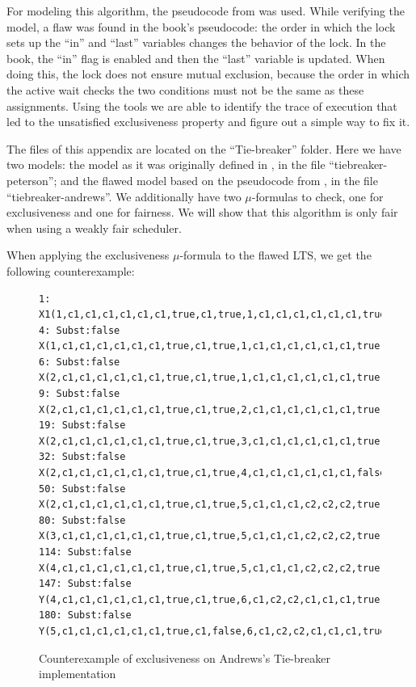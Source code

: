 \documentclass[11pt]{article}
\theoremstyle{definition}
\theoremstyle{plain}
\theoremstyle{definition}
\begin{document}
\begin{appendices}
For modeling this algorithm, the pseudocode from \cite{andrews2000foundations} was used. While verifying the model, a flaw was found in the book's pseudocode: the order in which the lock sets up the ``in'' and ``last'' variables changes the behavior of the lock. In the book, the ``in'' flag is enabled and then the ``last'' variable is updated. When doing this, the lock does not ensure mutual exclusion, because the order in which the active wait checks the two conditions must not be the same as these assignments. Using the tools we are able to identify the trace of execution that led to the unsatisfied exclusiveness property and figure out a simple way to fix it.

The files of this appendix are located on the ``Tie-breaker'' folder. Here we have two models: the model as it was originally defined in \cite{Peterson1981115}, in the file ``tiebreaker-peterson''; and the flawed model based on the pseudocode from \cite{andrews2000foundations}, in the file ``tiebreaker-andrews''. We additionally have two $ \mu $-formulas to check, one for exclusiveness and one for fairness. We will show that this algorithm is only fair when using a weakly fair scheduler.

When applying the exclusiveness $ \mu$-formula to the flawed LTS, we get the following counterexample:

\begin{figure}[h]
\begin{lstlisting}
1: X1(1,c1,c1,c1,c1,c1,c1,true,c1,true,1,c1,c1,c1,c1,c1,c1,true,c1,true,false,false,c1)
4: Subst:false   X(1,c1,c1,c1,c1,c1,c1,true,c1,true,1,c1,c1,c1,c1,c1,c1,true,c1,true,false,false,c1)
6: Subst:false   X(2,c1,c1,c1,c1,c1,c1,true,c1,true,1,c1,c1,c1,c1,c1,c1,true,c1,true,false,false,c1)
9: Subst:false   X(2,c1,c1,c1,c1,c1,c1,true,c1,true,2,c1,c1,c1,c1,c1,c1,true,c2,true,false,false,c2)
19: Subst:false   X(2,c1,c1,c1,c1,c1,c1,true,c1,true,3,c1,c1,c1,c1,c1,c1,true,c1,true,false,true,c2)
32: Subst:false   X(2,c1,c1,c1,c1,c1,c1,true,c1,true,4,c1,c1,c1,c1,c1,c1,false,c1,true,false,true,c2)
50: Subst:false   X(2,c1,c1,c1,c1,c1,c1,true,c1,true,5,c1,c1,c1,c2,c2,c2,true,c1,false,false,true,c2)
80: Subst:false   X(3,c1,c1,c1,c1,c1,c1,true,c1,true,5,c1,c1,c1,c2,c2,c2,true,c1,false,true,true,c2)
114: Subst:false   X(4,c1,c1,c1,c1,c1,c1,true,c1,true,5,c1,c1,c1,c2,c2,c2,true,c1,false,true,true,c2)
147: Subst:false   Y(4,c1,c1,c1,c1,c1,c1,true,c1,true,6,c1,c2,c2,c1,c1,c1,true,c1,false,true,true,c2)
180: Subst:false   Y(5,c1,c1,c1,c1,c1,c1,true,c1,false,6,c1,c2,c2,c1,c1,c1,true,c1,false,true,true,c2)
\end{lstlisting}
\caption{Counterexample of exclusiveness on Andrews's Tie-breaker implementation}
\end{figure}


\end{appendices}
\end{document}
